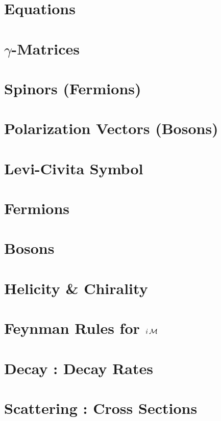 \documentclass[landscape,8pt,a4paper,english]{extarticle}
\begin{document}
\begin{multicols*}{3}\centering
        \section*{Equations}
        \section*{$\gamma$-Matrices}
        \section*{Spinors (Fermions)}
        \section*{Polarization Vectors (Bosons)}
        \section*{Levi-Civita Symbol}
        \section*{Fermions}
        \section*{Bosons}
        \section*{Helicity \& Chirality}
        \section*{Feynman Rules for $i\operatorname{\mathcal{M}}$}
        \section*{Decay : Decay Rates}
        \section*{Scattering : Cross Sections}
\end{multicols*}
\end{document}
